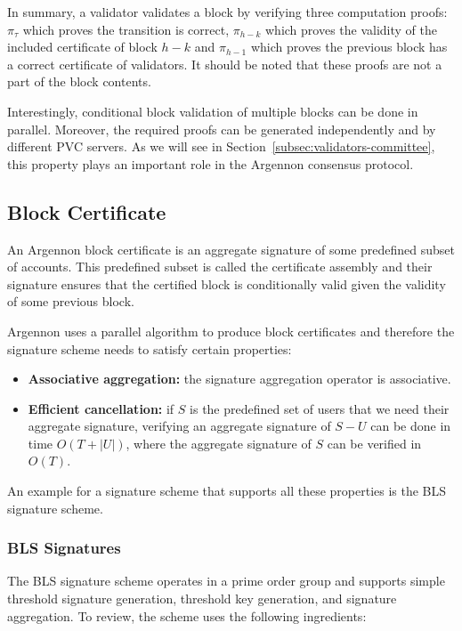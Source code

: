 In summary, a validator validates a block by verifying three computation proofs: $\pi_{\tau}$ which proves the
transition is correct, $\pi_{h-k}$ which proves the validity of the included certificate of block $h-k$ and $\pi_{h-1}$
which proves the previous block has a correct certificate of validators. It should be noted that these proofs are not
a part of the block contents.

Interestingly, conditional block validation of multiple blocks can be done in parallel. Moreover, the required proofs
can be generated independently and by different PVC servers. As we will see in
Section~\ref{subsec:validators-committee}, this property plays an important role in the Argennon consensus protocol.

\subsection{Block Certificate}\label{subsec:block-certificate}

An Argennon block certificate is an aggregate signature of some predefined subset of accounts. This predefined subset
is called the certificate assembly and their signature ensures that the certified block is conditionally
valid given the validity of some previous block.

Argennon uses a parallel algorithm to produce block certificates and therefore the signature scheme needs to satisfy
certain properties:
\begin{itemize}
    \item \textbf{Associative aggregation:} the signature aggregation operator is associative.
    \item \textbf{Efficient cancellation:} if $S$ is the predefined set of users that we need their aggregate
    signature, verifying an aggregate signature of $S-U$ can be done in time $O(T+|U|)$, where the aggregate
    signature of $S$ can be verified in
    $O(T)$.
\end{itemize}

An example for a signature scheme that supports all these properties is the BLS signature scheme.

\subsubsection{BLS Signatures}

The BLS signature scheme operates in a prime order group and supports simple threshold signature generation,
threshold key generation, and signature aggregation. To review, the scheme uses the following ingredients:

